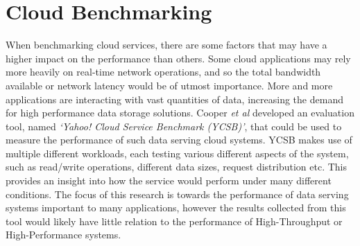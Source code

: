 \documentclass{llncs}
\begin{document}
\section{Cloud Benchmarking}\label{sec:bench}


When benchmarking cloud services, there are some factors that may have a higher impact on the performance than others. Some cloud applications may rely more heavily on real-time network operations, and so the total bandwidth available or network latency would be of utmost importance. More and more applications are interacting with vast quantities of data, increasing the demand for high performance data storage solutions. Cooper \textit{et al}\cite{cooper2010benchmarking} developed an evaluation tool, named \textit{`Yahoo! Cloud Service Benchmark (YCSB)'}, that could be used to measure the performance of such data serving cloud systems. YCSB makes use of multiple different workloads, each testing various different aspects of the system, such as read/write operations, different data sizes, request distribution etc. This provides an insight into how the service would perform under many different conditions. The focus of this research is towards the performance of data serving systems important to many applications, however the results collected from this tool would likely have little relation to the performance of High-Throughput or High-Performance systems.
\end{document}
